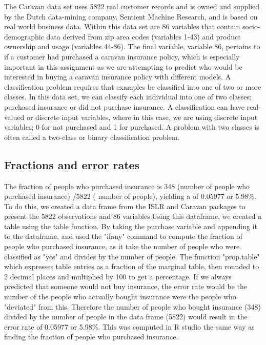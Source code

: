 \documentclass{article}
\begin{document}
The Caravan data set uses 5822 real customer records and is owned and supplied by the Dutch data-mining company, Sentient Machine Research, and is based on real world business data. Within this data set are 86 variables that contain socio-demographic data derived from zip area codes (variables 1-43) and product ownership and usage (variables 44-86). The final variable, variable 86, pertains to if a customer had purchased a caravan insurance policy, which is especially important in this assignment as we are attempting to predict who would be interested in buying a caravan insurance policy with different models.  A classification problem requires that examples be classified into one of two or more classes. In this data set, we can classify each individual into one of two classes; purchased insurance or did not purchase insurance. A classification can have real-valued or discrete input variables, where in this case, we are using discrete input variables; 0 for not purchased and 1 for purchased. A problem with two classes is often called a two-class or binary classification problem.

\subsection{Fractions and error rates}
The fraction of people who purchased insurance is 348 (number of people who purchased insurance) /5822 (  number of people), yielding a   of 0.05977 or 5.98\%. To do this, we created a data frame from the ISLR and Caravan packages to present the 5822 observations and 86 variables.Using this dataframe, we created a table using the table function. By taking the purchase variable and appending it to the dataframe, and used the "ifany" command to compute the fraction of people who purchased insurance, as it take the number of people who were classified as "yes" and divides by the   number of people. The function "prop.table" which expresses table entries as a fraction of the marginal table, then rounded to 2 decimal places and multiplied by 100 to get a percentage. If we always predicted that someone would not buy insurance, the error rate would be the number of the people who actually bought insurance were the people who "deviated" from this. Therefore the number of people who bought insurance (348) divided by the   number of people in the data frame (5822) would result in the error rate of 0.05977 or 5.98\%. This was computed in R studio the same way as finding the fraction of people who purchased insurance.
\end{document}
